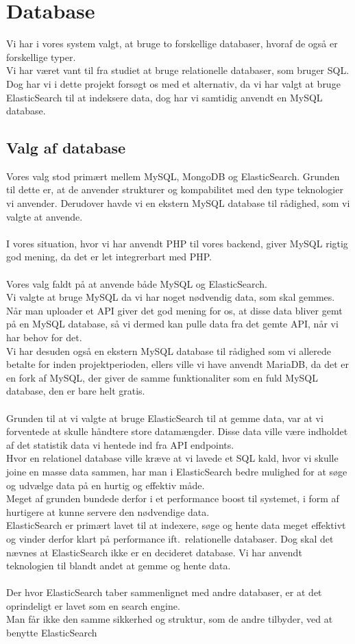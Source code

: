 \section{Database}
Vi har i vores system valgt, at bruge to forskellige databaser, hvoraf de også er forskellige typer.
\\
Vi har været vant til fra studiet at bruge relationelle databaser, som bruger SQL. Dog har vi i dette projekt 
forsøgt os med et alternativ, da vi har valgt at bruge ElasticSearch til at indeksere data, dog har vi samtidig anvendt en MySQL database.
\subsection{Valg af database}
Vores valg stod primært mellem MySQL, MongoDB og ElasticSearch. Grunden til dette er, at de anvender strukturer og
kompabilitet med den type teknologier vi anvender. Derudover havde vi en ekstern MySQL database til rådighed, som vi valgte at anvende.
\\\\
I vores situation, hvor vi har anvendt PHP til vores backend, giver MySQL rigtig god mening, da det er let integrerbart med PHP.
\\\\
Vores valg faldt på at anvende både MySQL og ElasticSearch.
\\
Vi valgte at bruge MySQL da vi har noget nødvendig data, som skal gemmes. Når man uploader et API giver det god mening
for os, at disse data bliver gemt på en MySQL database, så vi dermed kan pulle data fra det gemte API, når vi har behov for det.\\
Vi har desuden også en ekstern MySQL database til rådighed som vi allerede betalte for inden projektperioden, ellers ville vi have anvendt MariaDB, da det er en fork af MySQL, 
der giver de samme funktionaliter som en fuld MySQL database, den er bare helt gratis.
\\\\
Grunden til at vi valgte at bruge ElasticSearch til at gemme data, var at vi forventede at skulle håndtere store datamængder.
Disse data ville være indholdet af det statistik data vi hentede ind fra API endpoints.
\\
Hvor en relationel database ville kræve at vi lavede et SQL kald, hvor vi skulle joine en masse data sammen, har man i ElasticSearch
bedre mulighed for at søge og udvælge data på en hurtig og effektiv måde.
\\
Meget af grunden bundede derfor i et performance boost til systemet, i form af hurtigere at kunne servere den nødvendige data.
\\
ElasticSearch er primært lavet til at indexere, søge og hente data meget effektivt og vinder derfor klart på performance ift.\ relationelle databaser.
Dog skal det nævnes at ElasticSearch ikke er en decideret database. Vi har anvendt teknologien til blandt andet at gemme og hente data.\\
\\
Der hvor ElasticSearch taber sammenlignet med andre databaser, er at det oprindeligt er lavet som en search engine.
\\Man får ikke den samme sikkerhed og struktur, som de andre tilbyder, ved at benytte ElasticSearch
